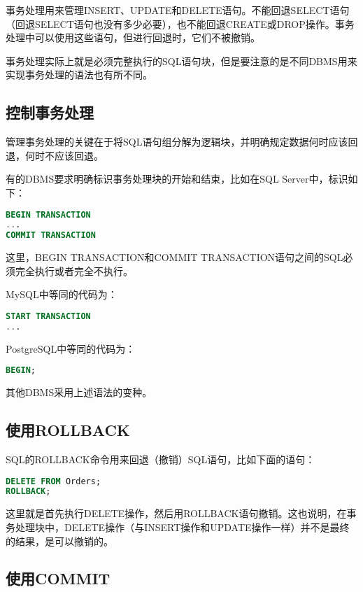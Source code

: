事务处理用来管理INSERT、UPDATE和DELETE语句。不能回退SELECT语句（回退SELECT语句也没有多少必要），也不能回退CREATE或DROP操作。事务处理中可以使用这些语句，但进行回退时，它们不被撤销。

事务处理实际上就是必须完整执行的SQL语句块，但是要注意的是不同DBMS用来实现事务处理的语法也有所不同。


\subsection{控制事务处理}

管理事务处理的关键在于将SQL语句组分解为逻辑块，并明确规定数据何时应该回退，何时不应该回退。

有的DBMS要求明确标识事务处理块的开始和结束，比如在SQL Server中，标识如下：

\begin{lstlisting}[language=SQL]
BEGIN TRANSACTION
...
COMMIT TRANSACTION
\end{lstlisting}

这里，BEGIN TRANSACTION和COMMIT TRANSACTION语句之间的SQL必须完全执行或者完全不执行。

MySQL中等同的代码为：

\begin{lstlisting}[language=SQL]
START TRANSACTION
...
\end{lstlisting}

PostgreSQL中等同的代码为：

\begin{lstlisting}[language=SQL]
BEGIN;
\end{lstlisting}

其他DBMS采用上述语法的变种。


\subsection{使用ROLLBACK}



SQL的ROLLBACK命令用来回退（撤销）SQL语句，比如下面的语句：

\begin{lstlisting}[language=SQL]
DELETE FROM Orders;
ROLLBACK;
\end{lstlisting}

这里就是首先执行DELETE操作，然后用ROLLBACK语句撤销。这也说明，在事务处理块中，DELETE操作（与INSERT操作和UPDATE操作一样）并不是最终的结果，是可以撤销的。

\subsection{使用COMMIT}


